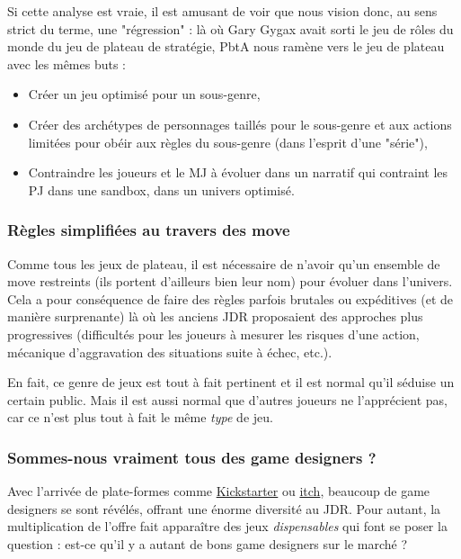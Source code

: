 \documentclass[a4paper, 11pt, twoside]{article}
\begin{document}
Si cette analyse est vraie, il est amusant de voir que nous vision donc, au sens strict du terme, une "régression" : là où Gary Gygax avait sorti le jeu de rôles du monde du jeu de plateau de stratégie, PbtA nous ramène vers le jeu de plateau avec les mêmes buts :
\begin{itemize}
\item Créer un jeu optimisé pour un sous-genre,
\item Créer des archétypes de personnages taillés pour le sous-genre et aux actions limitées pour obéir aux règles du sous-genre (dans l'esprit d'une "série"),
\item Contraindre les joueurs et le MJ à évoluer dans un narratif qui contraint les PJ dans une sandbox, dans un univers optimisé.
\end{itemize}

\subsubsection{Règles simplifiées au travers des move}
\label{sec:org4e0d4d8}

Comme tous les jeux de plateau, il est nécessaire de n'avoir qu'un ensemble de move restreints (ils portent d'ailleurs bien leur nom) pour évoluer dans l'univers. Cela a pour conséquence de faire des règles parfois brutales ou expéditives (et de manière surprenante) là où les anciens JDR proposaient des approches plus progressives (difficultés pour les joueurs à mesurer les risques d'une action, mécanique d'aggravation des situations suite à échec, etc.).

En fait, ce genre de jeux est tout à fait pertinent et il est normal qu'il séduise un certain public. Mais il est aussi normal que d'autres joueurs ne l'apprécient pas, car ce n'est plus tout à fait le même \emph{type} de jeu.

\subsubsection{Sommes-nous vraiment tous des game designers ?}
\label{sec:orge330b76}

Avec l'arrivée de plate-formes comme \href{https://www.kickstarter.com}{Kickstarter} ou \href{https://itch.io}{itch}, beaucoup de game designers se sont révélés, offrant une énorme diversité au JDR. Pour autant, la multiplication de l'offre fait apparaître des jeux \emph{dispensables} qui font se poser la question : est-ce qu'il y a autant de bons game designers sur le marché ?
\end{document}
